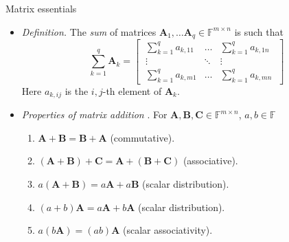 \documentclass{beamer}
\numberwithin{equation}{section}
\begin{document}
\begin{frame}{Matrix essentials}
    \begin{itemize}
        \item
        \textit{Definition.} The \textit{sum} of matrices 
        $ \mathbf{A}_1, \ldots \mathbf{A}_q \in \mathbb{F}^{m \times n }$ is
        such that
        \begin{equation*}
            \sum_{k = 1}^q\mathbf{A}_k = \begin{bmatrix}
                \ \sum_{k = 1}^qa_{k, 11} & \ldots &
                    \sum_{k = 1}^qa_{k, 1n} \ \\
                \ \vdots & \ddots & \vdots \ \\
                \ \sum_{k = 1}^qa_{k, m1} & \ldots & \sum_{k = 1}^qa_{k, mn} \
            \end{bmatrix}
        \end{equation*}
        Here $ a_{k, ij} $ is the $ i, j $-th element of $ \mathbf{A}_k $.

        \item
        \textit{Properties of matrix addition} \cite{jacob_linalg}. For
        $ \mathbf{A}, \mathbf{B}, \mathbf{C} \in \mathbb{F}^{m \times n} $,
        $ a, b \in \mathbb{F} $
        \begin{enumerate}
            \item
            $ \mathbf{A} + \mathbf{B} = \mathbf{B} + \mathbf{A} $
            (commutative).

            \item
            $ (\mathbf{A} + \mathbf{B}) + \mathbf{C} = \mathbf{A} +
            (\mathbf{B} + \mathbf{C}) $ (associative).

            \item
            $ a(\mathbf{A} + \mathbf{B}) = a\mathbf{A} + a\mathbf{B} $ (scalar
            distribution).

            \item
            $ (a + b)\mathbf{A} = a\mathbf{A} + b\mathbf{A} $ (scalar
            distribution).

            \item
            $ a(b\mathbf{A}) = (ab)\mathbf{A} $ (scalar associativity).
        \end{enumerate}
    \end{itemize}
\end{frame}
\end{document}

